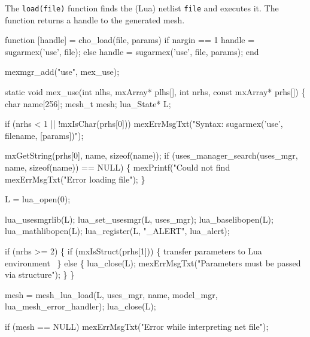 The {\tt{}load(file)} function finds the (Lua) netlist {\tt{}file} and
executes it.  The function returns a handle to the generated mesh.

\nwenddocs{}\endmoddef
function [handle] = cho_load(file, params)
if nargin == 1
  handle = sugarmex('use', file);
else
  handle = sugarmex('use', file, params);
end
\nwendcode{}\nwdocspar

\nwenddocs{}\plusendmoddef
mexmgr_add("use", mex_use);
\nwendcode{}\nwdocspar

\nwenddocs{}\plusendmoddef
static void mex_use(int nlhs, mxArray* plhs[],
                    int nrhs, const mxArray* prhs[])
\{
    char        name[256];
    mesh_t      mesh;
    lua_State*  L;

    if (nrhs < 1 || !mxIsChar(prhs[0]))
        mexErrMsgTxt("Syntax: sugarmex('use', filename, [params])");

    mxGetString(prhs[0], name, sizeof(name));
    if (uses_manager_search(uses_mgr, name, sizeof(name)) == NULL) \{
        mexPrintf("Could not find %
        mexErrMsgTxt("Error loading file");
    \}
    
    L = lua_open(0);

    lua_usesmgrlib(L);
    lua_set_usesmgr(L, uses_mgr);
    lua_baselibopen(L);
    lua_mathlibopen(L);
    lua_register(L, "_ALERT", lua_alert);

    if (nrhs >= 2) \{
        if (mxIsStruct(prhs[1])) \{
            \LA{}transfer parameters to Lua environment~{\nwtagstyle{}}\RA{}
        \} else \{
            lua_close(L);
            mexErrMsgTxt("Parameters must be passed via structure");
        \}
    \}

    mesh = mesh_lua_load(L, uses_mgr, name, model_mgr, lua_mesh_error_handler);
    lua_close(L);

    if (mesh == NULL)
        mexErrMsgTxt("Error while interpreting net file");

